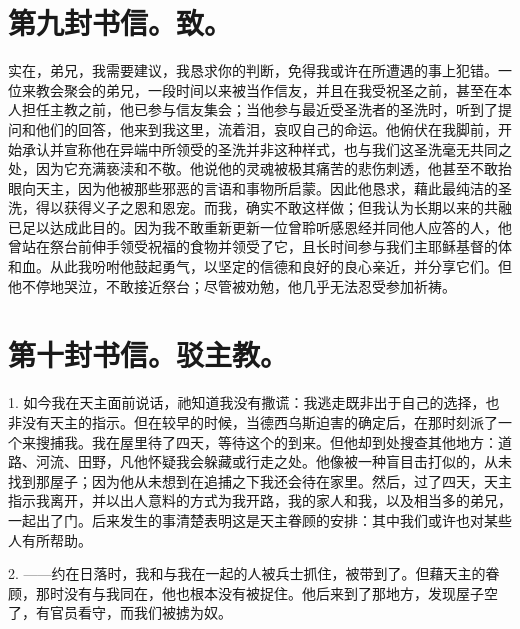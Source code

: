 
\section{第九封书信。致。}

实在，弟兄，我需要建议，我恳求你的判断，免得我或许在所遭遇的事上犯错。一位来教会聚会的弟兄，一段时间以来被当作信友，并且在我受祝圣之前，甚至在本人担任主教之前，他已参与信友集会；当他参与最近受圣洗者的圣洗时，听到了提问和他们的回答，他来到我这里，流着泪，哀叹自己的命运。他俯伏在我脚前，开始承认并宣称他在异端中所领受的圣洗并非这种样式，也与我们这圣洗毫无共同之处，因为它充满亵渎和不敬。他说他的灵魂被极其痛苦的悲伤刺透，他甚至不敢抬眼向天主，因为他被那些邪恶的言语和事物所启蒙。因此他恳求，藉此最纯洁的圣洗，得以获得义子之恩和恩宠。而我，确实不敢这样做；但我认为长期以来的共融已足以达成此目的。因为我不敢重新更新一位曾聆听感恩经并同他人应答的人，他曾站在祭台前伸手领受祝福的食物并领受了它，且长时间参与我们主耶稣基督的体和血。从此我吩咐他鼓起勇气，以坚定的信德和良好的良心亲近，并分享它们。但他不停地哭泣，不敢接近祭台；尽管被劝勉，他几乎无法忍受参加祈祷。\par


\section{第十封书信。驳主教。}

1. 如今我在天主面前说话，祂知道我没有撒谎：我逃走既非出于自己的选择，也非没有天主的指示。但在较早的时候，当德西乌斯迫害的确定后，在那时刻派了一个来搜捕我。我在屋里待了四天，等待这个的到来。但他却到处搜查其他地方：道路、河流、田野，凡他怀疑我会躲藏或行走之处。他像被一种盲目击打似的，从未找到那屋子；因为他从未想到在追捕之下我还会待在家里。然后，过了四天，天主指示我离开，并以出人意料的方式为我开路，我的家人和我，以及相当多的弟兄，一起出了门。后来发生的事清楚表明这是天主眷顾的安排：其中我们或许也对某些人有所帮助。\par

2. ——约在日落时，我和与我在一起的人被兵士抓住，被带到了。但藉天主的眷顾，那时没有与我同在，他也根本没有被捉住。他后来到了那地方，发现屋子空了，有官员看守，而我们被掳为奴。\par

